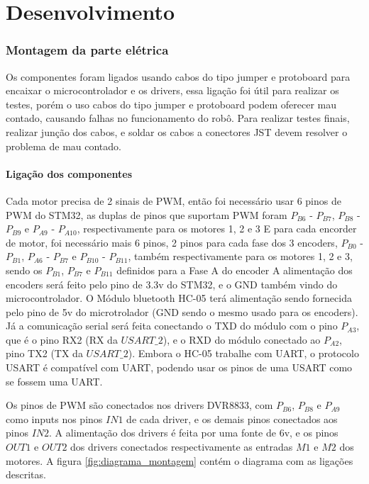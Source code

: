 

\chapter{Desenvolvimento}


\subsection{Montagem da parte elétrica}

Os componentes foram ligados usando cabos do tipo jumper e protoboard para encaixar o microcontrolador e os drivers,
essa ligação foi útil para realizar os testes, porém o uso cabos do tipo jumper e protoboard podem oferecer mau contado, causando falhas no funcionamento do robô.
Para realizar testes finais, realizar junção dos cabos, e soldar os cabos a conectores JST devem resolver o problema de mau contado.


\subsubsection{Ligação dos componentes}
Cada motor precisa de 2 sinais de PWM, então foi necessário usar 6 pinos de PWM do STM32, as duplas de pinos que suportam PWM foram $P_{B6}$ - $P_{B7}$, $P_{B8}$ - $P_{B9}$ e $P_{A9}$ - $P_{A10}$, respectivamente para os motores 1, 2 e 3
E para cada encorder de motor, foi necessário mais 6 pinos, 2 pinos para cada fase dos 3 encoders, $P_{B0}$ - $P_{B1}$, $P_{A6}$ - $P_{B7}$ e $P_{B10}$ - $P_{B11}$, também respectivamente para os motores 1, 2 e 3, sendo os  $P_{B1}$, $P_{B7}$ e $P_{B11}$ definidos para a Fase A do encoder
A alimentação dos encoders será feito pelo pino de 3.3v do STM32, e o GND também vindo do microcontrolador.
O Módulo bluetooth HC-05 terá alimentação sendo fornecida pelo pino de 5v do microtrolador (GND sendo o mesmo usado para os encoders).
Já a comunicação serial será feita conectando o TXD do módulo com o pino $P_{A3}$, que é o pino RX2 (RX da $USART\_2$), e o RXD do módulo conectado ao $P_{A2}$, pino TX2 (TX da $USART\_2$).
Embora o HC-05 trabalhe com UART, o protocolo USART é compatível com UART, podendo usar os pinos de uma USART como se fossem uma UART.

Os pinos de PWM são conectados nos drivers DVR8833, com  $P_{B6}$, $P_{B8}$ e $P_{A9}$ como inputs nos pinos $IN1$ de cada driver, e os demais pinos conectados aos pinos $IN2$.
A alimentação dos drivers é feita por uma fonte de 6v, e os pinos $OUT1$ e $OUT2$ dos drivers conectados respectivamente as entradas $M1$ e $M2$ dos motores. A figura \ref{fig:diagrama_montagem} contém o diagrama com as ligações descritas.

